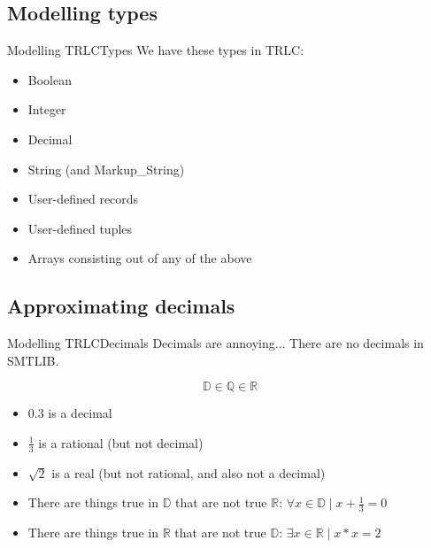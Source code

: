 \documentclass[aspectratio=169]{beamer}
\begin{document}
\subsection{Modelling types}
\begin{frame}{Modelling TRLC}{Types}
  We have these types in TRLC:
  \begin{itemize}
  \item Boolean 
  \item Integer 
  \item Decimal 
  \item String (and Markup\_String) 
  \item User-defined records \only<5->{(SMTLIB Datatypes)}
  \item User-defined tuples 
  \item Arrays consisting out of any of the above 
  \end{itemize}
\end{frame}

\subsection{Approximating decimals}

\begin{frame}{Modelling TRLC}{Decimals}
  Decimals are annoying... There are no decimals in SMTLIB.
  \begin{center}
    \begin{equation*}
      \mathbb{D} \in \mathbb{Q} \in \mathbb{R}
    \end{equation*}
  \end{center}
  \pause
  \begin{itemize}
  \item $0.3$ is a decimal
    \pause
  \item $\frac{1}{3}$ is a rational (but not decimal)
    \pause
  \item $\sqrt{2}$ is a real (but not rational, and also not a decimal)
    \pause
  \item There are things true in $\mathbb{D}$ that are not true
    $\mathbb{R}$: $\forall x \in \mathbb{D} \mid x + \frac{1}{3} = 0$
    \pause
  \item There are things true in $\mathbb{R}$ that are not true
    $\mathbb{D}$: $\exists x \in \mathbb{R} \mid x * x = 2$
  \end{itemize}
\end{frame}
\end{document}
